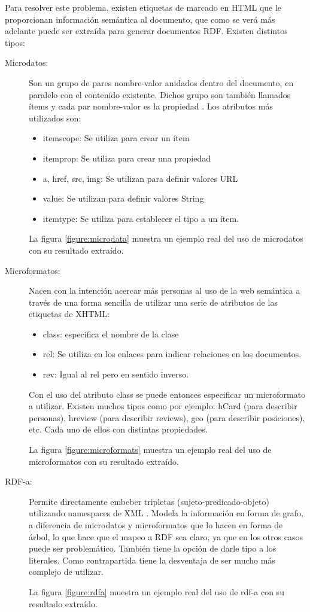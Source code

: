 Para resolver este problema, existen etiquetas de marcado en HTML que le proporcionan información semántica al documento, que como se verá más adelante 
puede ser extraída para generar documentos RDF. Existen distintos tipos:
\begin{description}
  \item[Microdatos:] Son un grupo de pares nombre-valor anidados dentro del documento, en paralelo con el contenido existente. Dichos grupo son 
también llamados ítems y cada par nombre-valor es la propiedad \cite{Hickson2012}. Los atributos más utilizados son:
  \begin{itemize}
    \item itemscope: Se utiliza para crear un ítem
    \item itemprop: Se utiliza para crear una propiedad
    \item a, href, src, img: Se utilizan para definir valores URL
    \item value: Se utilizan para definir valores String
    \item itemtype: Se utiliza para establecer el tipo a un ítem.
  \end{itemize}

  La figura \ref{figure:microdata} muestra un ejemplo real del uso de microdatos con su resultado extraído.
  \item[Microformatos:] Nacen con la intención acercar más personas al uso de la web semántica a través de una forma sencilla de utilizar 
una serie de atributos de las etiquetas de XHTML:

  \begin{itemize}
    \item class: especifica el nombre de la clase

    \item rel: Se utiliza en los enlaces para indicar relaciones en los documentos.

    \item rev: Igual al rel pero en sentido inverso.
  \end{itemize}
  
Con el uso del atributo class se puede entonces especificar un microformato a utilizar. Existen muchos tipos como por ejemplo: hCard (para describir 
personas), hreview (para describir reviews), geo (para describir posiciones), etc. Cada uno de ellos con distintas propiedades.

La figura \ref{figure:microformats} muestra un ejemplo real del uso de microformatos con su resultado extraído.
\item[RDF-a:]Permite directamente embeber tripletas (sujeto-predicado-objeto) utilizando namespaces de XML \cite{Celik}. Modela la información en forma de grafo, 
a diferencia de microdatos y microformatos que lo hacen en forma de árbol, lo que hace que el mapeo a RDF sea claro, ya que en los otros casos puede ser problemático.
También tiene la opción de darle tipo a los literales. Como contrapartida tiene la desventaja de ser mucho más complejo de utilizar. 

La figura \ref{figure:rdfa} muestra un ejemplo real del uso de rdf-a con su resultado extraído.
\end{description}

